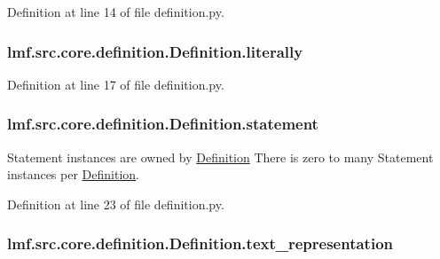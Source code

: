 Definition at line 14 of file definition.\+py.

\hypertarget{classlmf_1_1src_1_1core_1_1definition_1_1_definition_a03094eec5215fece01b3412c14e357f2}{
\subsubsection[{literally}]{\setlength{\rightskip}{0pt plus 5cm}lmf.\+src.\+core.\+definition.\+Definition.\+literally}}\label{classlmf_1_1src_1_1core_1_1definition_1_1_definition_a03094eec5215fece01b3412c14e357f2}


Definition at line 17 of file definition.\+py.

\hypertarget{classlmf_1_1src_1_1core_1_1definition_1_1_definition_acc8776ce9e16149eef1968f2bb1edd79}{
\subsubsection[{statement}]{\setlength{\rightskip}{0pt plus 5cm}lmf.\+src.\+core.\+definition.\+Definition.\+statement}}\label{classlmf_1_1src_1_1core_1_1definition_1_1_definition_acc8776ce9e16149eef1968f2bb1edd79}


Statement instances are owned by \hyperlink{classlmf_1_1src_1_1core_1_1definition_1_1_definition}{Definition} There is zero to many Statement instances per \hyperlink{classlmf_1_1src_1_1core_1_1definition_1_1_definition}{Definition}. 



Definition at line 23 of file definition.\+py.

\hypertarget{classlmf_1_1src_1_1core_1_1definition_1_1_definition_abae8500dbd7200fa3d76f5599ff00d37}{
\subsubsection[{text\+\_\+representation}]{\setlength{\rightskip}{0pt plus 5cm}lmf.\+src.\+core.\+definition.\+Definition.\+text\+\_\+representation}}\label{classlmf_1_1src_1_1core_1_1definition_1_1_definition_abae8500dbd7200fa3d76f5599ff00d37}


